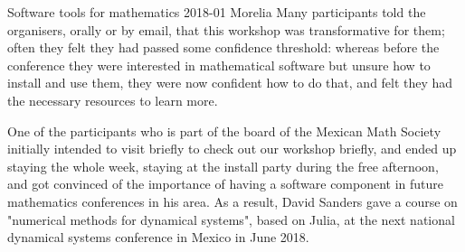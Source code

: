 \begin{event}{Software tools for mathematics 2018-01 Morelia}
Many participants told the organisers, orally or by email, that this workshop
was transformative for them; often they felt they had passed some confidence
threshold: whereas before the conference they were interested in mathematical
software but unsure how to install and use them, they were now confident how
to do that, and felt they had the necessary resources to learn more.

One of the participants who is part of the board of the Mexican Math Society
initially intended to visit briefly to check out our workshop briefly, and
ended up staying the whole week, staying at the install party during the free
afternoon, and got convinced of the importance of having a software component
in future mathematics conferences in his area. As a result, David Sanders
gave a course on "numerical methods for dynamical systems", based on Julia,
at the next national dynamical systems conference in Mexico in June 2018.


\end{event}